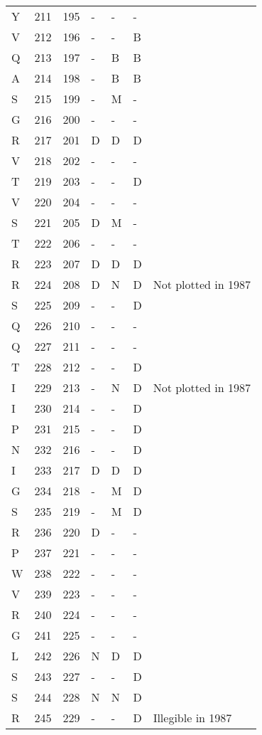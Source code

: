 \documentclass[10pt]{article}
\begin{document}
\begin{longtable}{lllllll}
  Y & 211 & 195 & - & - & - &  \\ 
  V & 212 & 196 & - & - & B &  \\ 
  Q & 213 & 197 & - & B & B &  \\ 
  A & 214 & 198 & - & B & B &  \\ 
  S & 215 & 199 & - & M & - &  \\ 
  G & 216 & 200 & - & - & - &  \\ 
  R & 217 & 201 & D & D & D &  \\ 
  V & 218 & 202 & - & - & - &  \\ 
  T & 219 & 203 & - & - & D &  \\ 
  V & 220 & 204 & - & - & - &  \\ 
  S & 221 & 205 & D & M & - &  \\ 
  T & 222 & 206 & - & - & - &  \\ 
  R & 223 & 207 & D & D & D &  \\ 
  R & 224 & 208 & D & N & D & Not plotted in 1987 \\ 
  S & 225 & 209 & - & - & D &  \\ 
  Q & 226 & 210 & - & - & - &  \\ 
  Q & 227 & 211 & - & - & - &  \\ 
  T & 228 & 212 & - & - & D &  \\ 
  I & 229 & 213 & - & N & D & Not plotted in 1987 \\ 
  I & 230 & 214 & - & - & D &  \\ 
  P & 231 & 215 & - & - & D &  \\ 
  N & 232 & 216 & - & - & D &  \\ 
  I & 233 & 217 & D & D & D &  \\ 
  G & 234 & 218 & - & M & D &  \\ 
  S & 235 & 219 & - & M & D &  \\ 
  R & 236 & 220 & D & - & - &  \\ 
  P & 237 & 221 & - & - & - &  \\ 
  W & 238 & 222 & - & - & - &  \\ 
  V & 239 & 223 & - & - & - &  \\ 
  R & 240 & 224 & - & - & - &  \\ 
  G & 241 & 225 & - & - & - &  \\ 
  L & 242 & 226 & N & D & D &  \\ 
  S & 243 & 227 & - & - & D &  \\ 
  S & 244 & 228 & N & N & D &  \\ 
  R & 245 & 229 & - & - & D & Illegible in 1987 \\ 

\end{longtable}
\end{document}

